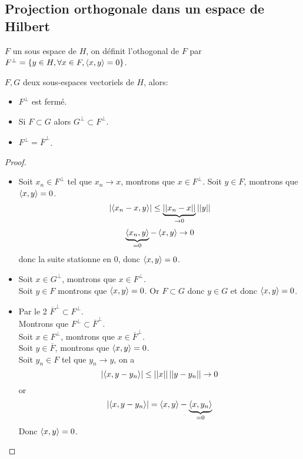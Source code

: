 \subsection{Projection orthogonale dans un espace de Hilbert}

\begin{definition}
	$F$ un sous espace de $H$, on définit l'othogonal de $F$ par $F^\perp = \{y \in H, \forall x \in F, \left\langle x, y \right\rangle = 0\}$.
\end{definition}

\begin{prop}
	$F, G$ deux sous-espaces vectoriels de $H$, alors:
	\begin{itemize}
		\item $F^\perp$ est fermé.
		\item Si $F \subset G$ alors $G^\perp \subset F^\perp$.
		\item $F^\perp = \overline{F}^\perp$.
	\end{itemize}
\end{prop}


\begin{proof}
	\begin{itemize}
		\item Soit $x_n \in F^\perp$ tel que $x_n \to x$, montrons que $x \in F^\perp$.
		      Soit $y \in F$, montrons que $\left\langle x, y \right\rangle = 0$.
		      $$ \left|\left\langle x_n-x, y \right\rangle\right| \leq  \underbrace{\left|\left|x_n-x\right|\right|}_{\to 0} \left|\left|y\right|\right| $$
		      $$ \underbrace{\left\langle x_n, y \right\rangle}_{=0} - \left\langle x, y \right\rangle  \to 0 $$
		      donc la suite stationne en 0, donc $\left\langle x, y \right\rangle = 0$.

		\item Soit $x \in G^\perp$, montrons que $x \in F^\perp$.\\
		      Soit $y \in F$ montrons que $\left\langle x, y \right\rangle = 0$. Or $F \subset G$ donc $y \in G$ et donc $\left\langle x, y \right\rangle = 0$.
		\item Par le 2 $\overline{F}^\perp \subset F^\perp$.\\
		      Montrons que $F^\perp \subset \overline{F}^\perp$.\\
		      Soit $x \in F^\perp$, montrons que $x \in \overline{F}^\perp$.\\
		      Soit $y \in \overline{F}$, montrons que $\left\langle x, y \right\rangle = 0$.\\
		      Soit $y_n \in F$ tel que $y_n \to y$, on a
		      $$ \left|\left\langle x, y- y_n \right\rangle\right| \leq \left|\left|x\right|\right| \left|\left|y-y_n\right|\right| \to 0 $$
		      or
		      $$  \left|\left\langle x, y- y_n \right\rangle\right| = \left\langle x, y \right\rangle -  \underbrace{\left\langle x, y_n \right\rangle}_{=0} $$
		      Donc $\left\langle x, y \right\rangle = 0$.
	\end{itemize}
\end{proof}

